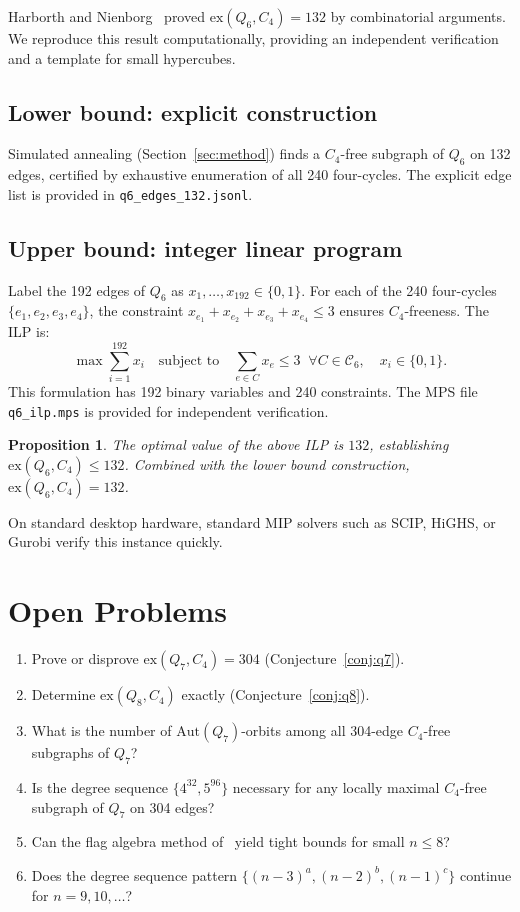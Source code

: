 \documentclass[12pt,a4paper]{article}
\newtheorem{proposition}[theorem]{Proposition}
\theoremstyle{definition}
\newcommand{\ex}{\mathrm{ex}}
\begin{document}
Harborth and Nienborg~\cite{HN94} proved $\ex(Q_6,C_4)=132$ by combinatorial
arguments.  We reproduce this result computationally, providing an independent
verification and a template for small hypercubes.

\subsection{Lower bound: explicit construction}

Simulated annealing (Section~\ref{sec:method}) finds a $C_4$-free subgraph of
$Q_6$ on 132 edges, certified by exhaustive enumeration of all 240 four-cycles.
The explicit edge list is provided in \texttt{q6\_edges\_132.jsonl}.

\subsection{Upper bound: integer linear program}

Label the 192 edges of $Q_6$ as $x_1,\ldots,x_{192}\in\{0,1\}$.
For each of the 240 four-cycles $\{e_1,e_2,e_3,e_4\}$,
the constraint $x_{e_1}+x_{e_2}+x_{e_3}+x_{e_4}\le3$ ensures $C_4$-freeness.
The ILP is:
\[
  \max\sum_{i=1}^{192}x_i \quad\text{subject to}\quad
  \sum_{e\in C}x_e\le3\;\;\forall C\in\mathcal{C}_6,\quad x_i\in\{0,1\}.
\]
This formulation has 192 binary variables and 240 constraints.
The MPS file \texttt{q6\_ilp.mps} is provided for independent verification.

\begin{proposition}\label{prop:q6ilp}
The optimal value of the above ILP is $132$, establishing $\ex(Q_6,C_4)\le132$.
Combined with the lower bound construction, $\ex(Q_6,C_4)=132$.
\end{proposition}

On standard desktop hardware, standard MIP solvers such as SCIP, HiGHS,
or Gurobi verify this instance quickly.

\section{Open Problems}\label{sec:open}

\begin{enumerate}
  \item Prove or disprove $\ex(Q_7,C_4)=304$ (Conjecture~\ref{conj:q7}).
  \item Determine $\ex(Q_8,C_4)$ exactly (Conjecture~\ref{conj:q8}).
  \item What is the number of $\mathrm{Aut}(Q_7)$-orbits among all 304-edge
    $C_4$-free subgraphs of $Q_7$?
  \item Is the degree sequence $\{4^{32},5^{96}\}$ necessary for any locally
    maximal $C_4$-free subgraph of $Q_7$ on 304 edges?
  \item Can the flag algebra method of~\cite{Bab12,BHLL12} yield tight bounds
    for small $n\le8$?
  \item Does the degree sequence pattern $\{(n-3)^a,(n-2)^b,(n-1)^c\}$
    continue for $n=9,10,\ldots$?
\end{enumerate}
\end{document}
